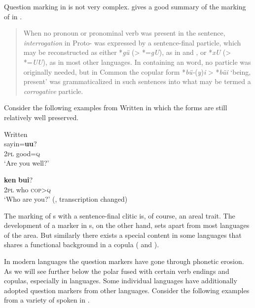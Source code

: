 Question marking in  is not very complex. \citet[27]{Janhunen2003a} gives a good summary of the marking of  in .

\begin{quote}
When no  pronoun or pronominal verb was present in the sentence, \textit{interrogation} in Proto- was expressed by a sentence-final  particle, which may be reconstructed as either *\textit{gü} (> *=\textit{gU}), as in  and , or *\textit{xU} (> *=\textit{UU}), as in most other  languages. In  containing an  word, no particle was originally needed, but in Common  the copular form *\textit{bü-}(\textit{y})\textit{i} > *\textit{büi} ‘being, present’ was grammaticalized in such sentences into what may be termed a \textit{corrogative} particle.
\end{quote}

Consider the following examples from Written  in which the forms are still relatively well preserved.

\ea%
    \label{ex:mong:2}
     Written \\
    \ea
     {sayin=}\textbf{{uu}}?\\
    2\textsc{pl}  good=\textsc{q}\\
    \glt ‘Are you well?’
    
    \ex
     \textbf{{ken}} \textbf{{bui}}?\\
    2\textsc{pl}  who  \textsc{cop}>\textsc{q}\\
    \glt ‘Who are you?’ (\citealt[53]{Janhunen2003b}, transcription changed)
    \z
    \z

The marking of s with a sentence-final clitic is, of course, an areal trait. The development of a marker in s, on the other hand, sets  apart from most languages of the area. But similarly there exists a special content  in some  languages that shares a functional background in a copula ( and ).

In modern  languages the question markers have gone through phonetic erosion. As we will see further below the polar  fused with certain verb endings and copulas, especially in  languages. Some individual  languages have additionally adopted question markers from other languages. Consider the following examples from a variety of  spoken in .

